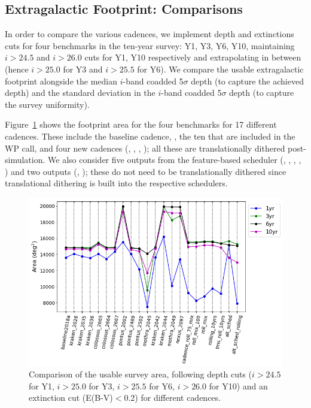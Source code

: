 \subsection{Extragalactic Footprint: Comparisons}
In order to compare the various cadences, we implement depth and extinctions cuts for four benchmarks in the ten-year survey: Y1, Y3, Y6, Y10, maintaining $i>24.5$ and $i>26.0$ cuts for Y1, Y10 respectively and extrapolating in between (hence $i>25.0$  for Y3 and $i>25.5$ for Y6). We compare the usable extragalactic footprint alongside the median $i$-band coadded 5$\sigma$ depth (to capture the achieved depth) and the standard deviation in the $i$-band coadded 5$\sigma$ depth (to capture the survey uniformity).

Figure~\ref{fig: compare_area} shows the footprint area for the four benchmarks for 17 different cadences. These include the baseline cadence, , the ten that are included in the WP call, and four new cadences (, , , ); all these are translationally dithered post- simulation. We also consider five outputs from the feature-based scheduler (, , , , ) and two  outputs (, ); these do not need to be translationally dithered since translational dithering is built into the respective schedulers.

\begin{figure}[H]
	\vspace*{2em}
	\centering\includegraphics[width=0.5\paperwidth,trim={30 40 40 40},clip=false]{figures/lss_compare_area_22dbs.png}
	\vspace*{1em}
	\caption{Comparison of the usable survey area, following depth cuts ($i>24.5$ for Y1, $i>25.0$ for Y3, $i>25.5$ for Y6, $i>26.0$ for Y10) and an extinction cut (E(B-V)$<0.2$) for different cadences.}
	\label{fig: compare_area}
\end{figure}

